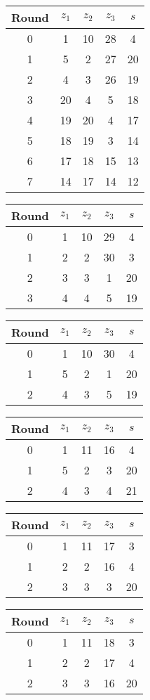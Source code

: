 \begin{multicols}{2}
\begin{tabular}{c | c | c | c | c }
Round & $z_1$ & $z_2$ & $z_3$ & $s$ \\
\hline
0 & 1 & 10 & 28 & 4 \\
1 & 5 & 2 & 27 & 20 \\
2 & 4 & 3 & 26 & 19 \\
3 & 20 & 4 & 5 & 18 \\
4 & 19 & 20 & 4 & 17 \\
5 & 18 & 19 & 3 & 14 \\
6 & 17 & 18 & 15 & 13 \\
7 & 14 & 17 & 14 & 12
\end{tabular}


\begin{tabular}{c | c | c | c | c }
Round & $z_1$ & $z_2$ & $z_3$ & $s$ \\
\hline
0 & 1 & 10 & 29 & 4 \\
1 & 2 & 2 & 30 & 3 \\
2 & 3 & 3 & 1 & 20 \\
3 & 4 & 4 & 5 & 19
\end{tabular}


\begin{tabular}{c | c | c | c | c }
Round & $z_1$ & $z_2$ & $z_3$ & $s$ \\
\hline
0 & 1 & 10 & 30 & 4 \\
1 & 5 & 2 & 1 & 20 \\
2 & 4 & 3 & 5 & 19
\end{tabular}


\begin{tabular}{c | c | c | c | c }
Round & $z_1$ & $z_2$ & $z_3$ & $s$ \\
\hline
0 & 1 & 11 & 16 & 4 \\
1 & 5 & 2 & 3 & 20 \\
2 & 4 & 3 & 4 & 21
\end{tabular}


\begin{tabular}{c | c | c | c | c }
Round & $z_1$ & $z_2$ & $z_3$ & $s$ \\
\hline
0 & 1 & 11 & 17 & 3 \\
1 & 2 & 2 & 16 & 4 \\
2 & 3 & 3 & 3 & 20
\end{tabular}


\begin{tabular}{c | c | c | c | c }
Round & $z_1$ & $z_2$ & $z_3$ & $s$ \\
\hline
0 & 1 & 11 & 18 & 3 \\
1 & 2 & 2 & 17 & 4 \\
2 & 3 & 3 & 16 & 20
\end{tabular}



\end{multicols}
